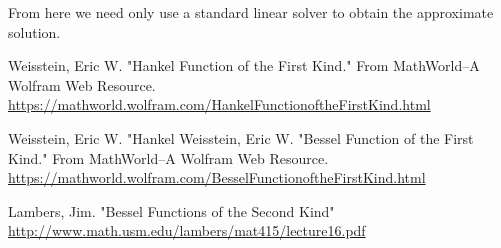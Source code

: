 \documentclass[10pt]{article}
\begin{document}
From here we need only use a standard linear solver to obtain the approximate solution.
\begin{thebibliography}{9}
     Weisstein, Eric W. "Hankel Function of the First Kind." From MathWorld--A Wolfram Web Resource. \url{https://mathworld.wolfram.com/HankelFunctionoftheFirstKind.html}
    
     Weisstein, Eric W. "Hankel Weisstein, Eric W. "Bessel Function of the First Kind." From MathWorld--A Wolfram Web Resource. 
    \url{https://mathworld.wolfram.com/BesselFunctionoftheFirstKind.html}

     Lambers, Jim. "Bessel Functions of the Second Kind"
    \url{http://www.math.usm.edu/lambers/mat415/lecture16.pdf}

\end{thebibliography}
\end{document}

